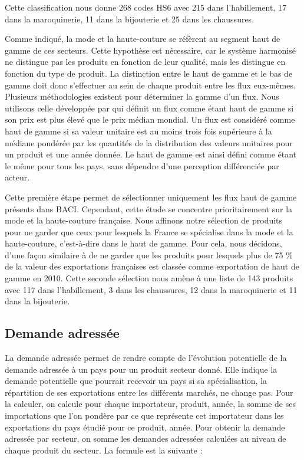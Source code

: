 \documentclass[french,10pt,a4paper]{article}
\begin{document}
Cette classification nous donne 268 codes HS6 avec 215 dans l'habillement, 17 dans la maroquinerie, 11 dans la bijouterie et 25 dans les chaussures. 

Comme indiqué, la mode et la haute-couture se réfèrent au segment haut de gamme de ces secteurs. Cette hypothèse est nécessaire, car le système harmonisé ne distingue pas les produits en fonction de leur qualité, mais les distingue en fonction du type de produit. La distinction entre le haut de gamme et le bas de gamme doit donc s'effectuer au sein de chaque produit entre les flux eux-mêmes. Plusieurs méthodologies existent pour déterminer la gamme d'un flux. Nous utilisons celle développée par \cite{Fontagne1997} qui définit un flux comme étant haut de gamme si son \og prix\fg{} est plus élevé que le \og prix\fg{} médian mondial. Un flux est considéré comme haut de gamme si sa valeur unitaire est au moins trois fois supérieure à la médiane pondérée par les quantités de la distribution des valeurs unitaires pour un produit et une année donnée. Le haut de gamme est ainsi défini comme étant le même pour tous les pays, sans dépendre d'une perception différenciée par acteur.

Cette première étape permet de sélectionner uniquement les flux haut de gamme présents dans BACI. Cependant, cette étude se concentre prioritairement sur la mode et la haute-couture française. Nous affinons notre sélection de produits pour ne garder que ceux pour lesquels la France se spécialise dans la mode et la haute-couture, c'est-à-dire dans le haut de gamme. Pour cela, nous décidons, d'une façon similaire à \cite{Martin2015} de ne garder que les produits pour lesquels plus de 75 \% de la valeur des exportations françaises est classée comme exportation de haut de gamme en 2010. Cette seconde sélection nous amène à une liste de 143 produits avec 117 dans l'habillement, 3 dans les chaussures, 12 dans la maroquinerie et 11 dans la bijouterie.

\subsection*{Demande adressée}

La demande adressée permet de rendre compte de l'évolution potentielle de la demande adressée à un pays pour un produit secteur donné. Elle indique la demande potentielle que pourrait recevoir un pays si sa spécialisation, la répartition de ses exportations entre les différents marchés, ne change pas. Pour la calculer, on calcule pour chaque importateur, produit, année, la somme de ses importations que l'on pondère par ce que représente cet importateur dans les exportations du pays étudié pour ce produit, année. Pour obtenir la demande adressée par secteur, on somme les demandes adressées calculées au niveau de chaque produit du secteur. La formule est la suivante :
\end{document}
